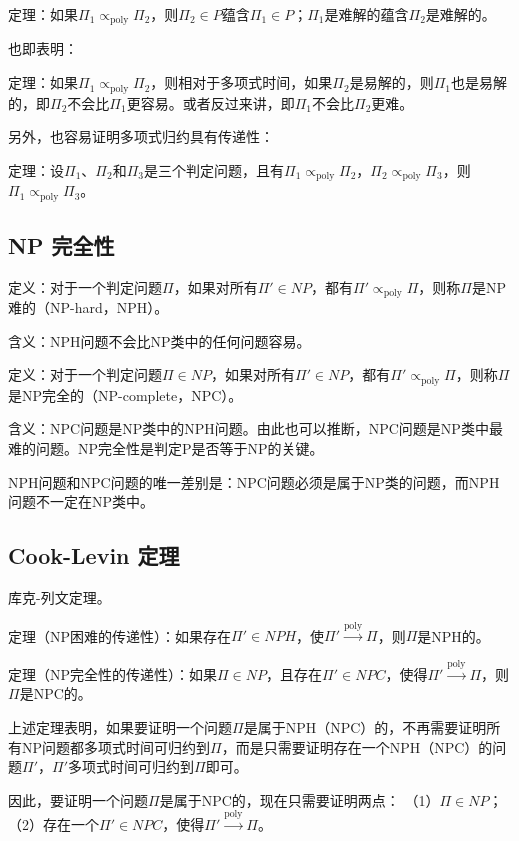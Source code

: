 \documentclass[./../main.tex]{subfiles}
\begin{document}
定理：如果$\Pi_{1}\propto_{\text{poly}}\Pi_{2}$，则$\Pi_{2}\in P$蕴含$\Pi_{1}\in P$；$\Pi_{1}$是难解的蕴含$\Pi_{2}$是难解的。

也即表明：

定理：如果$\Pi_{1}\propto_{\text{poly}}\Pi_{2}$，则相对于多项式时间，如果$\Pi_{2}$是易解的，则$\Pi_{1}$也是易解的，即$\Pi_{2}$不会比$\Pi_{1}$更容易。或者反过来讲，即$\Pi_{1}$不会比$\Pi_{2}$更难。

另外，也容易证明多项式归约具有传递性：

定理：设$\Pi_{1}$、$\Pi_{2}$和$\Pi_{3}$是三个判定问题，且有$\Pi_{1}\propto_{\text{poly}}\Pi_{2}$，$\Pi_{2}\propto_{\text{poly}}\Pi_{3}$，则$\Pi_{1}\propto_{\text{poly}}\Pi_{3}$。

\subsection{NP 完全性}
定义：对于一个判定问题$\Pi$，如果对所有$\Pi' \in NP$，都有$\Pi' \propto_{\text{poly}} \Pi$，则称$\Pi$是NP难的（NP-hard，NPH）。

含义：NPH问题不会比NP类中的任何问题容易。

定义：对于一个判定问题$\Pi \in NP$，如果对所有$\Pi' \in NP$，都有$\Pi' \propto_{\text{poly}} \Pi$，则称$\Pi$是NP完全的（NP-complete，NPC）。

含义：NPC问题是NP类中的NPH问题。由此也可以推断，NPC问题是NP类中最难的问题。NP完全性是判定P是否等于NP的关键。

NPH问题和NPC问题的唯一差别是：NPC问题必须是属于NP类的问题，而NPH问题不一定在NP类中。

\subsection{Cook-Levin 定理}
库克-列文定理。

定理（NP困难的传递性）：如果存在$\Pi '\in NPH$，使$\Pi '\xrightarrow{\text{poly}}\Pi$，则$\Pi$是NPH的。

定理（NP完全性的传递性）：如果$\Pi\in NP$，且存在$\Pi'\in NPC$，使得$\Pi'\xrightarrow{\text{poly}}\Pi$，则$\Pi$是NPC的。

上述定理表明，如果要证明一个问题$\Pi$是属于NPH（NPC）的，不再需要证明所有NP问题都多项式时间可归约到$\Pi$，而是只需要证明存在一个NPH（NPC）的问题$\Pi'$，$\Pi'$多项式时间可归约到$\Pi$即可。

因此，要证明一个问题$\Pi$是属于NPC的，现在只需要证明两点：
（1）$\Pi\in NP$；
（2）存在一个$\Pi'\in NPC$，使得$\Pi'\xrightarrow{\text{poly}}\Pi$。
\end{document}
